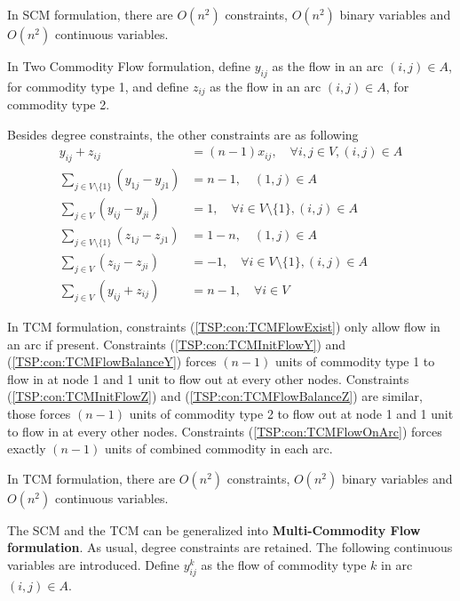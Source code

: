                 In SCM formulation, there are $O(n^2)$ constraints, $O(n^2)$ binary variables and $O(n^2)$ continuous variables.

                In Two Commodity Flow formulation, define $y_{ij}$ as the flow in an arc $(i, j) \in A$, for commodity type 1, and define $z_{ij}$ as the flow in an arc $(i, j) \in A$, for commodity type 2.

                Besides degree constraints, the other constraints are as following
                \begin{align}
                    y_{ij} + z_{ij} &= (n - 1) x_{ij}, \quad \forall i, j \in V, (i, j) \in A \label{TSP:con:TCMFlowExist} \\
                    \sum_{j \in V \setminus \{1\}} (y_{1j} - y_{j1}) &= n - 1, \quad (1, j) \in A \label{TSP:con:TCMInitFlowY}\\
                    \sum_{j \in V} (y_{ij} - y_{ji}) & = 1, \quad  \forall i \in V \setminus \{1\}, (i, j) \in A \label{TSP:con:TCMFlowBalanceY}\\
                    \sum_{j \in V \setminus \{1\}} (z_{1j} - z_{j1}) &= 1 - n, \quad (1, j) \in A \label{TSP:con:TCMInitFlowZ}\\
                    \sum_{j \in V} (z_{ij} - z_{ji}) & = -1, \quad  \forall i \in V \setminus \{1\}, (i, j) \in A \label{TSP:con:TCMFlowBalanceZ}\\
                    \sum_{j \in V} (y_{ij} + z_{ij}) &= n - 1, \quad \forall i \in V \label{TSP:con:TCMFlowOnArc}
                \end{align}

                In TCM formulation, constraints (\ref{TSP:con:TCMFlowExist}) only allow flow in an arc if present. Constraints (\ref{TSP:con:TCMInitFlowY}) and (\ref{TSP:con:TCMFlowBalanceY}) forces $(n - 1)$ units of commodity type 1 to flow in at node 1 and 1 unit to flow out at every other nodes. Constraints (\ref{TSP:con:TCMInitFlowZ}) and (\ref{TSP:con:TCMFlowBalanceZ}) are similar, those forces $(n - 1)$ units of commodity type 2 to flow out at node 1 and 1 unit to flow in at every other nodes. Constraints (\ref{TSP:con:TCMFlowOnArc}) forces exactly $(n - 1)$ units of combined commodity in each arc.

                In TCM formulation, there are $O(n^2)$ constraints, $O(n^2)$ binary variables and $O(n^2)$ continuous variables.

                The SCM and the TCM can be generalized into \textbf{Multi-Commodity Flow formulation}. As usual, degree constraints are retained. The following continuous variables are introduced. Define $y_{ij}^k$ as the flow of commodity type $k$ in arc $(i, j) \in A$.

